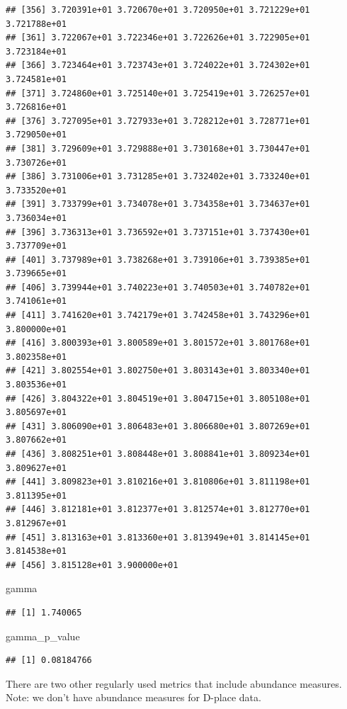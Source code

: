 \documentclass[]{book}
\newenvironment{Shaded}{\begin{snugshade}}{\end{snugshade}}
\newcommand{\NormalTok}[1]{{#1}}
\theoremstyle{definition}
\theoremstyle{definition}
\theoremstyle{remark}
\begin{document}
\begin{verbatim}
## [356] 3.720391e+01 3.720670e+01 3.720950e+01 3.721229e+01 3.721788e+01
## [361] 3.722067e+01 3.722346e+01 3.722626e+01 3.722905e+01 3.723184e+01
## [366] 3.723464e+01 3.723743e+01 3.724022e+01 3.724302e+01 3.724581e+01
## [371] 3.724860e+01 3.725140e+01 3.725419e+01 3.726257e+01 3.726816e+01
## [376] 3.727095e+01 3.727933e+01 3.728212e+01 3.728771e+01 3.729050e+01
## [381] 3.729609e+01 3.729888e+01 3.730168e+01 3.730447e+01 3.730726e+01
## [386] 3.731006e+01 3.731285e+01 3.732402e+01 3.733240e+01 3.733520e+01
## [391] 3.733799e+01 3.734078e+01 3.734358e+01 3.734637e+01 3.736034e+01
## [396] 3.736313e+01 3.736592e+01 3.737151e+01 3.737430e+01 3.737709e+01
## [401] 3.737989e+01 3.738268e+01 3.739106e+01 3.739385e+01 3.739665e+01
## [406] 3.739944e+01 3.740223e+01 3.740503e+01 3.740782e+01 3.741061e+01
## [411] 3.741620e+01 3.742179e+01 3.742458e+01 3.743296e+01 3.800000e+01
## [416] 3.800393e+01 3.800589e+01 3.801572e+01 3.801768e+01 3.802358e+01
## [421] 3.802554e+01 3.802750e+01 3.803143e+01 3.803340e+01 3.803536e+01
## [426] 3.804322e+01 3.804519e+01 3.804715e+01 3.805108e+01 3.805697e+01
## [431] 3.806090e+01 3.806483e+01 3.806680e+01 3.807269e+01 3.807662e+01
## [436] 3.808251e+01 3.808448e+01 3.808841e+01 3.809234e+01 3.809627e+01
## [441] 3.809823e+01 3.810216e+01 3.810806e+01 3.811198e+01 3.811395e+01
## [446] 3.812181e+01 3.812377e+01 3.812574e+01 3.812770e+01 3.812967e+01
## [451] 3.813163e+01 3.813360e+01 3.813949e+01 3.814145e+01 3.814538e+01
## [456] 3.815128e+01 3.900000e+01
\end{verbatim}

\begin{Shaded}
\begin{Highlighting}[]
\NormalTok{gamma }
\end{Highlighting}
\end{Shaded}

\begin{verbatim}
## [1] 1.740065
\end{verbatim}

\begin{Shaded}
\begin{Highlighting}[]
\NormalTok{gamma_p_value }
\end{Highlighting}
\end{Shaded}

\begin{verbatim}
## [1] 0.08184766
\end{verbatim}

There are two other regularly used metrics that include abundance
measures. Note: we don't have abundance measures for D-place data.
\end{document}
